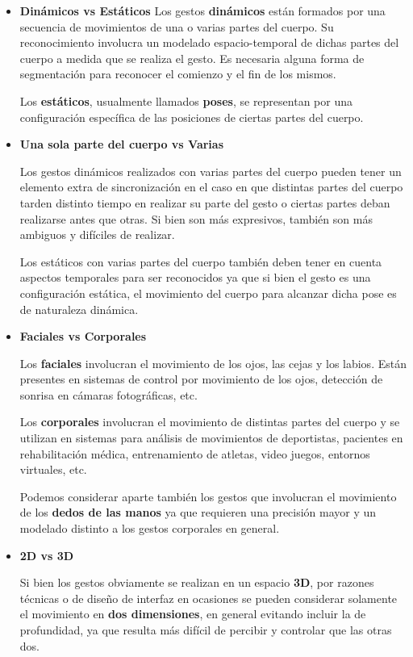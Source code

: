 \newcommand{\vs}{\textbf{vs }}

\newcommand{\vsitem}[2]{ \item \textbf{#1 \vs #2} }

\begin{itemize}

\vsitem{ Dinámicos}{Estáticos}
Los gestos \textbf{dinámicos} están formados por una secuencia de movimientos de una o varias partes del cuerpo. Su reconocimiento involucra un modelado espacio-temporal de dichas partes del cuerpo a medida que se realiza el gesto. Es necesaria alguna forma de segmentación para reconocer el comienzo y el fin de los mismos.

Los \textbf{estáticos}, usualmente llamados \textbf{poses}, se representan por una configuración específica de las posiciones de ciertas partes del cuerpo. 

\vsitem{Una sola parte del cuerpo}{Varias}

Los gestos dinámicos realizados con varias partes del cuerpo pueden tener un elemento extra de sincronización en el caso en que distintas partes del cuerpo tarden distinto tiempo en realizar su parte del gesto o ciertas partes deban realizarse antes que otras. Si bien son más expresivos, también son más ambiguos y difíciles de realizar.

Los estáticos con varias partes del cuerpo también deben tener en cuenta aspectos temporales para ser reconocidos ya que si bien el gesto es una configuración estática, el movimiento del cuerpo para alcanzar dicha pose es de naturaleza dinámica.

\vsitem{Faciales}{Corporales}

Los \textbf{faciales} involucran el movimiento de los ojos, las cejas y los labios. Están presentes en sistemas de control por movimiento de los ojos, detección de sonrisa en cámaras fotográficas, etc. 

Los \textbf{corporales} involucran el movimiento de distintas partes del cuerpo y se utilizan en sistemas para análisis de movimientos de deportistas, pacientes en rehabilitación médica, entrenamiento de atletas, video juegos, entornos virtuales, etc.

Podemos considerar aparte también los gestos que involucran el movimiento de los \textbf{dedos de las manos} ya que requieren una precisión mayor y un modelado distinto a los gestos corporales en general.

\vsitem{2D}{3D}

Si bien los gestos obviamente se realizan en un espacio \textbf{3D}, por razones técnicas o de diseño de interfaz en ocasiones se pueden considerar solamente el movimiento en \textbf{dos dimensiones}, en general evitando incluir la de profundidad, ya que resulta más difícil de percibir y controlar que las otras dos.


\end{itemize}
